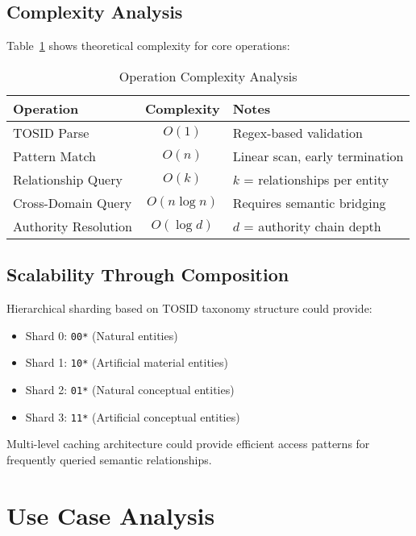 \documentclass[conference]{IEEEtran}
\begin{document}
\subsection{Complexity Analysis}

Table~\ref{tab:performance} shows theoretical complexity for core operations:

\begin{table}[htbp]
\caption{Operation Complexity Analysis}
\begin{center}
\begin{tabular}{|l|c|l|}
\hline
\textbf{Operation} & \textbf{Complexity} & \textbf{Notes} \\
\hline
TOSID Parse & $O(1)$ & Regex-based validation \\
Pattern Match & $O(n)$ & Linear scan, early termination \\
Relationship Query & $O(k)$ & $k$ = relationships per entity \\
Cross-Domain Query & $O(n \log n)$ & Requires semantic bridging \\
Authority Resolution & $O(\log d)$ & $d$ = authority chain depth \\
\hline
\end{tabular}
\end{center}
\label{tab:performance}
\end{table}

\subsection{Scalability Through Composition}

Hierarchical sharding based on TOSID taxonomy structure could provide:

\begin{itemize}
\item Shard 0: \texttt{00*} (Natural entities)
\item Shard 1: \texttt{10*} (Artificial material entities)
\item Shard 2: \texttt{01*} (Natural conceptual entities)  
\item Shard 3: \texttt{11*} (Artificial conceptual entities)
\end{itemize}

Multi-level caching architecture could provide efficient access patterns for frequently queried semantic relationships.

\section{Use Case Analysis}
\end{document}
